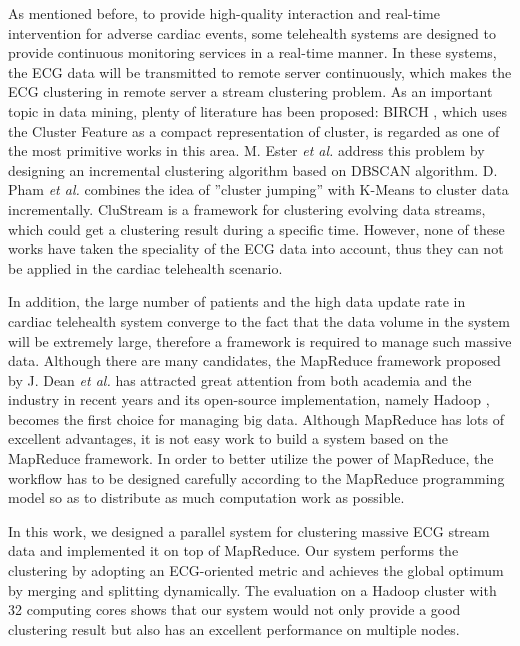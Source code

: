 \documentclass[conference]{IEEEtran}
\begin{document}
As mentioned before, to provide high-quality interaction and real-time intervention for adverse cardiac events, some telehealth systems are designed to provide continuous monitoring services in a real-time manner. In these systems, the ECG data will be transmitted to remote server continuously, which makes the ECG clustering in remote server a stream clustering problem. As an important topic in data mining, plenty of literature has been proposed: BIRCH \cite{Zhang:1996:BED:235968.233324}, which uses the Cluster Feature as a compact representation of cluster, is regarded as one of the most primitive works in this area. M. Ester \textit{et al.} \cite{Ester:1998:ICM:645924.671201} address this problem by designing an incremental clustering algorithm based on DBSCAN algorithm. D. Pham \textit{et al.} \cite{pham2004incremental} combines the idea of ''cluster jumping'' with K-Means to cluster data incrementally. CluStream \cite{aggarwal2003framework} is a framework for clustering evolving data streams, which could get a clustering result during a specific time. However, none of these works have taken the speciality of the ECG data into account, thus they can not be applied in the cardiac telehealth scenario. 


In addition, the large number of patients and the high data update rate in cardiac telehealth system converge to the fact that the data volume in the system will be extremely large, therefore a framework is required to manage such massive data. Although there are many candidates, the MapReduce framework  proposed by J. Dean \textit{et al.} \cite{dean2008mapreduce} has attracted great attention from both academia and the industry in recent years and its open-source implementation, namely Hadoop \cite{white2010hadoop}, becomes the first choice for managing big data. Although MapReduce has lots of excellent advantages, it is not easy work to build a system based on the MapReduce framework. In order to better utilize the power of MapReduce, the workflow has to be designed carefully according to the MapReduce programming model so as to distribute as much computation work as possible.


In this work, we designed a parallel system for clustering massive ECG stream data and implemented it on top of MapReduce. Our system performs the clustering by adopting an ECG-oriented metric and achieves the global optimum by merging and splitting dynamically. The evaluation on a Hadoop cluster with 32 computing cores shows that our system would not only provide a good clustering result but also has an excellent performance on multiple nodes.
\end{document}
